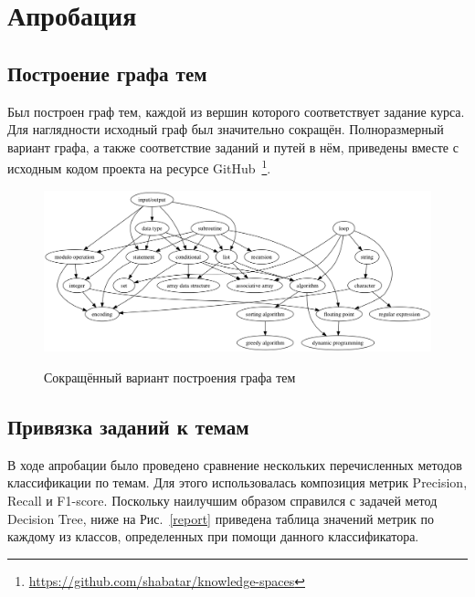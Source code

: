 \documentclass[14pt]{matmex-diploma-custom}
\begin{document}
\section{Апробация}

\subsection{Построение графа тем}
Был построен граф тем, каждой из вершин которого соответствует задание курса. Для наглядности исходный граф был значительно сокращён. Полноразмерный вариант графа, а также соответствие заданий и путей в нём, приведены вместе с исходным кодом проекта на ресурсе GitHub~\footnote{\url{https://github.com/shabatar/knowledge-spaces}}.
\begin{figure}[!htb]
\caption{Сокращённый вариант построения графа тем}
\hspace*{-2cm}\includegraphics[width=18cm]{themegraph}
\label{themegraph}
\end{figure}

\subsection{Привязка заданий к темам}
В ходе апробации было проведено сравнение нескольких перечисленных методов классификации по темам. Для этого использовалась композиция метрик Precision, Recall и F1-score. Поскольку наилучшим образом справился с задачей метод Decision Tree, ниже на Рис.~\ref{report} приведена таблица значений метрик по каждому из классов, определенных при помощи данного классификатора.
\end{document}
